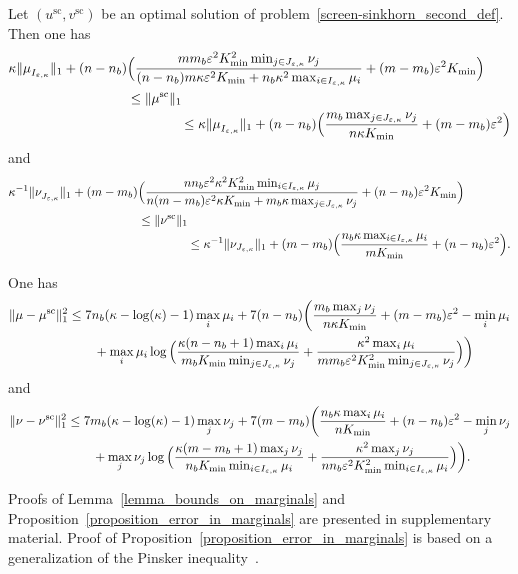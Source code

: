 \begin{lemma}
\label{lemma_bounds_on_marginals}
Let $(u^{\text{sc}}, v^{\text{sc}})$ be an optimal solution of problem~\eqref{screen-sinkhorn_second_def}.
Then one has 
\begin{align*}
 \kappa \|\mu_{I_{\varepsilon,\kappa}}^{\text{}}\|_1  + (n -n_b) &\Big(\frac{mm_b\varepsilon^2 K_{\min}^2 \min_{j\in J_{\varepsilon, \kappa}} \nu_j}{ (n-n_b)m\kappa \varepsilon^2 K_{\min} + n_b\kappa^2 \max_{i\in I_{\varepsilon,\kappa}}\mu_i } + (m-m_b)\varepsilon^2K_{\min}\Big)\\
 & \leq \|\mu^{\text{sc}}\|_1\\
 & \qquad \qquad \leq \kappa \|\mu_{I_{\varepsilon,\kappa}}^{\text{}}\|_1 + (n-n_b) \Big(\frac{m_b\max_{j \in J_{\varepsilon,\kappa}} \nu_j}{n\kappa K_{\min}} + (m-m_b)\varepsilon^2 \Big)
\end{align*}
and 
\begin{align*}
\kappa^{-1} \|\nu_{J_{\varepsilon,\kappa}}^{\text{}}\|_1 + (m -m_b) &\Big(\frac{nn_b\varepsilon^2\kappa^2K_{\min}^2 \min_{i\in I_{\varepsilon, \kappa}} \mu_j}{ n(m-m_b)\varepsilon^2 \kappa K_{\min} + m_b\kappa \max_{j\in J_{\varepsilon,\kappa}}\nu_j } + (n-n_b)\varepsilon^2K_{\min}\Big)\\
&\leq \|\nu^{\text{sc}}\|_1\\
 & \qquad \qquad \leq \kappa^{-1} \|\nu_{J_{\varepsilon,\kappa}}\|_1 + (m-m_b)\Big(\frac{n_b\kappa \max_{i\in I_{\varepsilon,\kappa}}\mu_i}{m K_{\min}} + (n-n_b)\varepsilon^2\Big).
\end{align*}
\end{lemma}
\begin{proposition}
\label{proposition_error_in_marginals}
One has %
\begin{align}
\label{maginal_mu}
{\|{\mu} -{\mu}^{\text{sc}}\|^2_1}&\leq 7 n_b(\kappa-\log(\kappa)-1)\max_{i} \mu_i + 7 (n-n_b)\bigg(\frac{m_b\max_{j}\nu_j}{n\kappa K_{\min}} + (m- m_b) \varepsilon^2 - \min_{i}\mu_i \nonumber\\
&\qquad + \max_{i} \mu_i\log\Big(\frac{\kappa(n-n_b+ 1)\max_{i} \mu_i}{m_b K_{\min}\min_{j \in J_{\varepsilon,\kappa}}\nu_j} + \frac{\kappa^2\max_{i} \mu_i}{mm_b\varepsilon^2K_{\min}^2\min_{j \in J_{\varepsilon,\kappa}}\nu_j}\Big)\bigg)
\end{align}
and 
\begin{align}
\label{maginal_nu}
{\|{\nu} -{\nu}^{\text{sc}}\|^2_1} &\leq 7 m_b(\kappa-\log(\kappa)-1)\max_{j} \nu_j + 7(m-m_b)\bigg(\frac{n_b\kappa\max_{i}\mu_i}{n K_{\min}} + (n- n_b) \varepsilon^2 - \min_{j}\nu_j\nonumber\\ 
&\qquad + \max_{j} \nu_j\log\Big(\frac{\kappa(m-m_b+ 1)\max_{j} \nu_j}{n_b K_{\min}\min_{i \in I_{\varepsilon,\kappa}}\mu_i} + \frac{\kappa^2\max_{j} \nu_j}{nn_b\varepsilon^2K_{\min}^2\min_{i \in I_{\varepsilon,\kappa}}\mu_i}\Big)\bigg).
\end{align}
\end{proposition}
Proofs of Lemma~\ref{lemma_bounds_on_marginals} and Proposition~\ref{proposition_error_in_marginals} are presented in supplementary material. 
Proof of Proposition~\ref{proposition_error_in_marginals} is based on a generalization of the Pinsker inequality~\cite{altschulernips17,khalilabid2018}.

